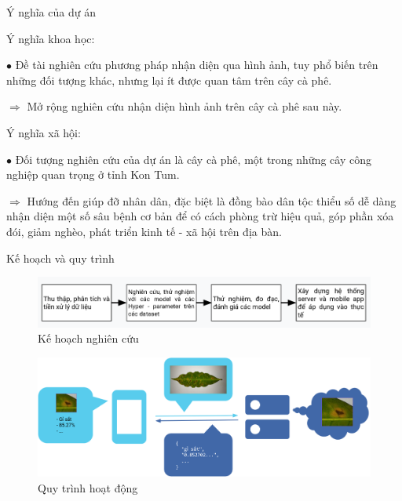 \documentclass{beamer}
\begin{document}
\begin{frame}[allowframebreaks]{Ý nghĩa của dự án}
	
	Ý nghĩa khoa học:

	\null

	$\bullet$ Đề tài nghiên cứu phương pháp nhận diện qua hình ảnh, tuy phổ biến trên những đối tượng khác, nhưng lại ít được quan tâm trên cây cà phê.
	
	\null

	$\Rightarrow$ Mở rộng nghiên cứu nhận diện hình ảnh trên cây cà phê sau này.

	\framebreak

	Ý nghĩa xã hội:

	\null

	$\bullet$ Đối tượng nghiên cứu của dự án là cây cà phê, một trong những cây công nghiệp quan trọng ở tỉnh Kon Tum.

	\null

	$\Rightarrow$ Hướng đến giúp đỡ nhân dân, đặc biệt là đồng bào dân tộc thiểu số dễ dàng nhận diện một số sâu bệnh cơ bản để có cách phòng trừ hiệu quả, góp phần xóa đói, giảm nghèo, phát triển kinh tế - xã hội trên địa bàn.

\end{frame}

\begin{frame}[allowframebreaks]{Kế hoạch và quy trình}
	\begin{figure}[H]
		\includegraphics[scale=0.4]{images/plans}
		\caption{Kế hoạch nghiên cứu}
	\end{figure}

	\framebreak

	\begin{figure}[H]
		\includegraphics[scale=0.32]{images/chart.png}
		\caption{Quy trình hoạt động}
	\end{figure}

\end{frame}
\end{document}
